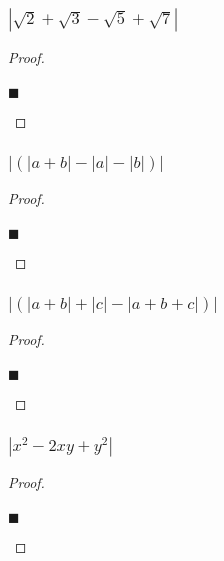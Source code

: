 \documentclass[letterpaper, 10 pt, conference]{ieeeconf}  %
\begin{document}
\subsubsection{\textbf{$\left\lvert \sqrt{2} + \sqrt{3} - \sqrt{5} + \sqrt{7} \right\rvert$}}
\begin{proof}
\begin{align}
    
\end{align}
\begin{flushright}
$\blacksquare$
\end{flushright}
\end{proof}

\subsubsection{\textbf{$\left\lvert 
        (\left\lvert a + b \right\rvert - \left\lvert a \right\rvert - \left\lvert b \right\rvert) 
    \right\rvert$}}
\begin{proof}
\begin{align}
    
\end{align}
\begin{flushright}
$\blacksquare$
\end{flushright}
\end{proof}

\subsubsection{\textbf{$\left\lvert (\left\lvert a + b \right\rvert + \left\lvert c \right\rvert - \left\lvert a + b + c \right\rvert) \right\rvert$}}
\begin{proof}
\begin{align}
    
\end{align}
\begin{flushright}
$\blacksquare$
\end{flushright}
\end{proof}

\subsubsection{\textbf{$\left\lvert x^2 - 2xy + y^2\right\rvert$}}
\begin{proof}
\begin{align}
    
\end{align}
\begin{flushright}
$\blacksquare$
\end{flushright}
\end{proof}
\end{document}
